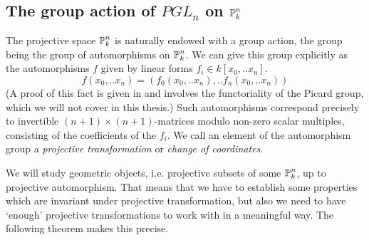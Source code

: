 \subsection{The group action of $PGL_n$ on $\operatorname{\mathbb P}^n_k$}

The projective space $\operatorname{\mathbb P}^n_k$ is naturally endowed with a group action, the group being the group of automorphisms on $\operatorname{\mathbb P}^n_k$.
We can give this group explicitly as the automorphisms $f$ given by linear forms $f_i \in k[x_0,..x_n]$.
\begin{equation}
f(x_0,..x_n) = (f_0(x_0,..x_n),..f_n(x_0,..x_n))
\end{equation}
(A proof of this fact is given in \cite[example 7.1.1]{hartshorne1977algebraic} and involves the functoriality of the Picard group, which we will not cover in this thesis.)
Such automorphisms correspond precisely to invertible $(n+1)\times(n+1)$-matrices modulo non-zero scalar multiples, consisting of the coefficients of the $f_i$.
We call an element of the automorphism group a \emph{projective transformation} or \emph{change of coordinates}.

We will study geometric objects, i.e. projective subsets of some $\operatorname{\mathbb P}^n_k$, up to projective automorphism.
That means that we have to establish some properties which are invariant under projective transformation, but also we need to have `enough' projective transformations to work with in a meaningful way.
The following theorem makes this precise.

